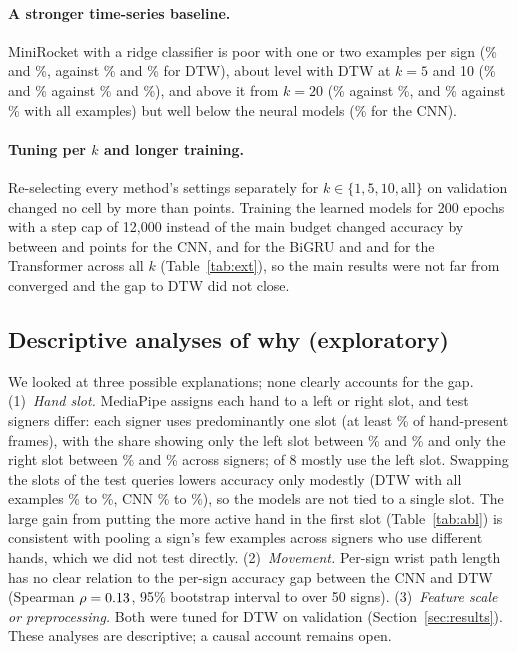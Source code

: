 \paragraph{A stronger time-series baseline.} MiniRocket with a ridge classifier \citep{dempster2020rocket} is poor with one or two examples per sign
(\accRocketVFiftyKOne\% and \accRocketVFiftyKTwo\%, against \accDtwVFiftyKOne\% and \accDtwVFiftyKTwo\% for DTW), about level with DTW at $k=5$
and 10 (\accRocketVFiftyKFive\% and \accRocketVFiftyKTen\% against \accDtwVFiftyKFive\% and \accDtwVFiftyKTen\%), and above it from
$k=20$ (\accRocketVFiftyKTwenty\% against \accDtwVFiftyKTwenty\%, and \accRocketVFiftyKAll\% against \accDtwVFiftyKAll\% with all examples)
but well below the neural models (\accCnnVFiftyKAll\% for the CNN).
\paragraph{Tuning per $k$ and longer training.} Re-selecting every method's settings separately for $k\in\{1,5,10,\text{all}\}$ on validation
changed no cell by more than \perkMaxChange{} points. Training the learned models for 200 epochs with a step cap of 12{,}000 instead of the
main budget changed accuracy by between \longMinGainCnn{} and \longMaxGainCnn{} points for the CNN, \longMinGainGru{} and \longMaxGainGru{} for
the BiGRU and \longMinGainTrans{} and \longMaxGainTrans{} for the Transformer across all $k$ (Table~\ref{tab:ext}), so the main results
were not far from converged and the gap to DTW did not close.

\subsection{Descriptive analyses of why (exploratory)}
We looked at three possible explanations; none clearly accounts for the gap. (1)~\emph{Hand slot.} MediaPipe assigns each hand to a left or right slot, and test signers differ:
each signer uses predominantly one slot (at least \whyMinDominantShare\% of hand-present frames), with the share showing only the left slot between \whyLeftOnlyMin\% and
\whyLeftOnlyMax\% and only the right slot between \whyRightOnlyMin\% and \whyRightOnlyMax\% across signers; \whyNLeftMajority{} of 8 mostly use the left
slot. Swapping the slots of the test queries lowers accuracy only modestly (DTW with all examples \whySwapDtwNormalAll\% to \whySwapDtwSwappedAll\%,
CNN \whySwapCnnNormalAll\% to \whySwapCnnSwappedAll\%), so the models are not tied to a single slot. The large gain from putting the more active hand in the first slot
(Table~\ref{tab:abl}) is consistent with pooling a sign's few examples across signers who use different hands, which we did not test directly.
(2)~\emph{Movement.} Per-sign wrist path length has no clear relation to the per-sign accuracy gap between the CNN and DTW
(Spearman $\rho=0.13$, 95\% bootstrap interval \whyMotionLo{} to \whyMotionHi{} over 50 signs).
(3)~\emph{Feature scale or preprocessing.} Both were tuned for DTW on validation (Section~\ref{sec:results}). These analyses are descriptive; a causal account remains open.
